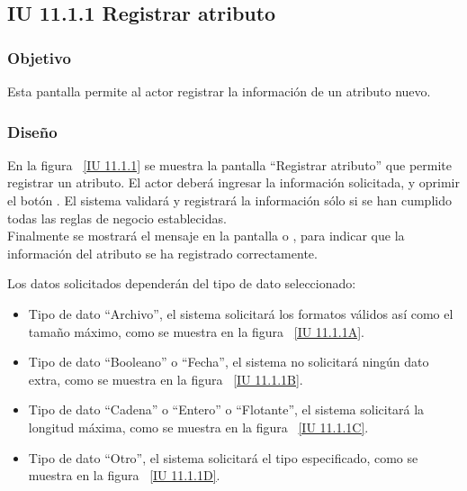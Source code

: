 \subsection{IU 11.1.1 Registrar atributo}

\subsubsection{Objetivo}
	
	Esta pantalla permite al actor registrar la información de un atributo nuevo.

\subsubsection{Diseño}

    En la figura ~\ref{IU 11.1.1} se muestra la pantalla ``Registrar atributo'' que permite registrar un atributo. El actor deberá ingresar la información solicitada,
    y oprimir el botón . El sistema validará y registrará la información sólo si se han cumplido todas las reglas de negocio establecidas.  \\
    
    Finalmente se mostrará el mensaje  en la pantalla  o , para indicar que la información del atributo
    se ha registrado correctamente.        

	Los datos solicitados dependerán del tipo de dato seleccionado:
	\begin{itemize}
		\item Tipo de dato ``Archivo'', el sistema solicitará los formatos válidos así como el tamaño máximo, como se muestra en la figura ~\ref{IU 11.1.1A}.
		\item Tipo de dato ``Booleano'' o ``Fecha'', el sistema no solicitará ningún dato extra, como se muestra en la figura ~\ref{IU 11.1.1B}.
		\item Tipo de dato ``Cadena'' o ``Entero'' o ``Flotante'', el sistema solicitará la longitud máxima, como se muestra en la figura ~\ref{IU 11.1.1C}.
		\item Tipo de dato ``Otro'', el sistema solicitará el tipo especificado, como se muestra en la figura ~\ref{IU 11.1.1D}.
	\end{itemize}
	

